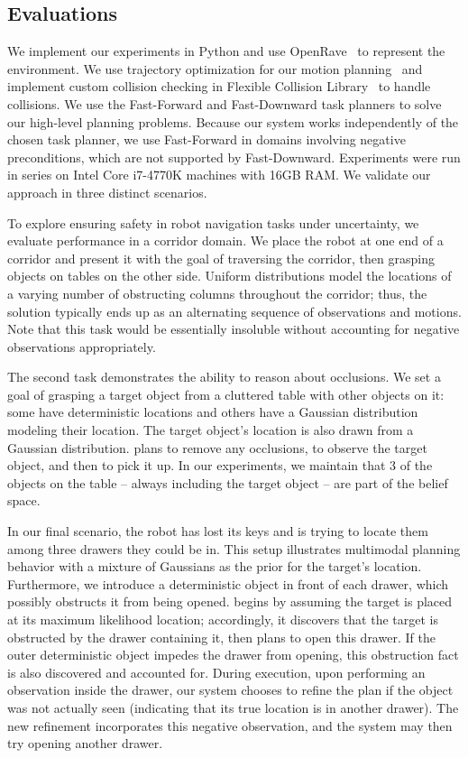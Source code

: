 \subsection{Evaluations}
We implement our experiments in Python and use
OpenRave~\cite{Diankov_2008_6117} to represent the environment. We use
trajectory optimization for our motion planning~\cite{schulman2013finding}
and implement custom collision checking in Flexible Collision Library~\cite{jia2014fcl} to handle
collisions. We use the Fast-Forward and Fast-Downward
task planners to solve our high-level planning problems. Because our system works
independently of the chosen task planner, we use Fast-Forward in domains involving negative
preconditions, which are not supported by Fast-Downward. Experiments were run in series on
Intel Core i7-4770K machines with 16GB RAM. We validate our approach in three distinct scenarios.

To explore ensuring safety in robot navigation tasks under uncertainty, we
evaluate performance in a corridor domain. We place the robot at one end of a corridor
and present it with the goal of traversing the corridor, then grasping
objects on tables on the other side. Uniform distributions model the locations of
a varying number of obstructing columns throughout the corridor; thus, the solution
typically ends up as an alternating sequence of observations and motions. Note that this task would be essentially
insoluble without accounting for negative observations appropriately.

The second task demonstrates the ability to reason about occlusions. We
set a goal of grasping a target object from a cluttered table with other
objects on it: some have deterministic locations and others have a Gaussian distribution
modeling their location. The target object's location is also drawn from a Gaussian
distribution. \ibsp{} plans to remove any occlusions, to observe the target object, and
then to pick it up. In our experiments, we maintain that 3 of the objects on the table -- always including
the target object -- are part of the belief space.

In our final scenario, the robot has lost its keys and is trying to locate them among three drawers they could be in.
This setup illustrates multimodal planning behavior with a mixture of Gaussians as the prior for the target's location.
Furthermore, we introduce a deterministic object in front of each drawer, which possibly
obstructs it from being opened. \ibsp{} begins by assuming the target is placed at its maximum likelihood
location; accordingly, it discovers that the target is obstructed by the drawer containing it, then
plans to open this drawer. If the outer deterministic object impedes the drawer from opening, this
obstruction fact is also discovered and accounted for. During execution, upon performing an observation inside the drawer, our system
chooses to refine the plan if the object was not actually seen (indicating that its true location is in another drawer).
The new refinement incorporates this negative observation, and the system may then try opening another drawer.

